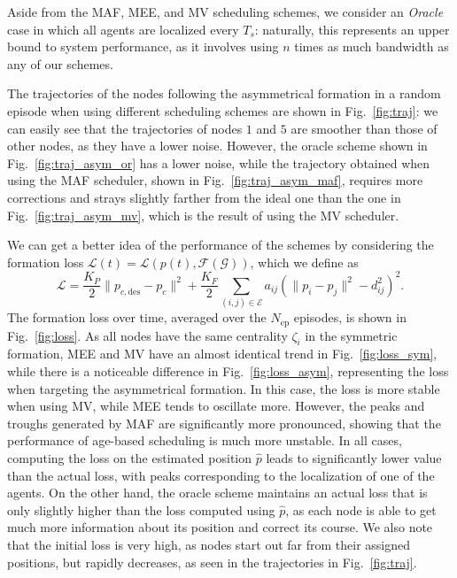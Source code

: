 \documentclass{ifac/ifacconf}
\begin{document}
Aside from the MAF, MEE, and MV scheduling schemes, we consider an \emph{Oracle} case in which all agents are localized every $T_s$: naturally, this represents an upper bound to system performance, as it involves using $n$ times as much bandwidth as any of our schemes.


The trajectories of the nodes following the asymmetrical formation in a random episode when using different scheduling schemes are shown in Fig.~\ref{fig:traj}: we can easily see that the trajectories of nodes $1$ and $5$ are smoother than those of other nodes, as they have a lower noise.  However, the oracle scheme shown in Fig.~\ref{fig:traj_asym_or} has a lower noise, while the trajectory obtained when using the MAF scheduler, shown in Fig.~\ref{fig:traj_asym_maf}, requires more corrections and strays slightly farther from the ideal one than the one in Fig.~\ref{fig:traj_asym_mv}, which is the result of using the MV scheduler.



We can get a better idea of the performance of the schemes by considering the formation loss $\mathcal{L}(t) = \mathcal{L}(p(t),\mathcal{F}(\mathcal{G})) $, which we define as
\begin{equation}
    \mathcal{L} = \frac{K_P}{2} \|p_{c,\text{des}}-p_c\|^2  
  +\frac{K_F}{2}\!\!\!\sum_{(i,j)\in\mathcal{E}} \!\!\!a_{ij}  \left(\|p_i-p_j\|^2-d_{ij}^2\right)^2.
\end{equation}
The formation loss over time, averaged over the $N_{\text{ep}}$ episodes, is shown in Fig.~\ref{fig:loss}. As all nodes have the same centrality $\zeta_i$ in the symmetric formation, MEE and MV have an almost identical trend in Fig.~\ref{fig:loss_sym}, while there is a noticeable difference in Fig.~\ref{fig:loss_asym}, representing the loss when targeting the asymmetrical formation. In this case, the loss is more stable when using MV, while MEE tends to oscillate more. However, the peaks and troughs generated by MAF are significantly more pronounced, showing that the performance of age-based scheduling is much more unstable. In all cases, computing the loss on the estimated position $\hat{p}$ leads to significantly lower value than the actual loss, with peaks corresponding to the localization of one of the agents. On the other hand, the oracle scheme maintains an actual loss that is only slightly higher than the loss computed using $\hat{p}$, as each node is able to get much more information about its position and correct its course. We also note that the initial loss  is very high, as nodes start out far from their assigned positions, but rapidly decreases, as seen in the trajectories in Fig.~\ref{fig:traj}.
\end{document}
